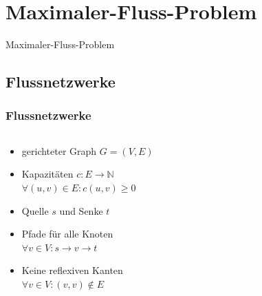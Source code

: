 \documentclass[draft]{beamer}
\begin{document}
\section{Maximaler-Fluss-Problem}
\begin{frame}[plain]
\begin{center}
\begin{LARGE}
Maximaler-Fluss-Problem
\end{LARGE}
\end{center}
\end{frame}

\subsection{Flussnetzwerke}
\begin{frame}
\frametitle{Flussnetzwerke}
\begin{columns}
\begin{column}{.45\textwidth}
\begin{itemize}
\item gerichteter Graph $G=(V,E)$
\item Kapazitäten $c: E \to \mathbb{N}$\\$\forall (u,v)\in E: c(u,v) \geq 0$
\item Quelle $s$ und Senke $t$
\item Pfade für alle Knoten\\$\forall v \in V:s \to v \to t$
\item Keine reflexiven Kanten\\$\forall v \in V: (v,v)\not\in E$
\end{itemize}
\end{column}
\begin{column}{.6\textwidth}
\begin{adjustbox}{width=\textwidth}
\end{adjustbox}
\end{column}
\end{columns}
\end{frame}
\end{document}
